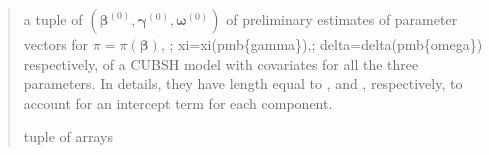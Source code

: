 \documentclass[letterpaper,10pt,english]{sphinxmanual}
\begin{document}
\begin{fulllineitems}
\begin{quote}
\begin{description}
\sphinxAtStartPar
a tuple of \((\pmb \beta^{(0)}, \pmb \gamma^{(0)}, \pmb \omega^{(0)})\) of preliminary estimates of parameter vectors for 
\(\pi = \pi(\pmb{\beta})\), ; xi=xi(pmb\{gamma\}),; delta=delta(pmb\{omega\})\textasciigrave{} respectively, of a CUBSH model with covariates for all the three
parameters. In details, they have length equal to ,  and
, respectively, to account for an intercept term for each component.

\sphinxAtStartPar
tuple of arrays

\end{description}\end{quote}

\end{fulllineitems}

\end{document}
